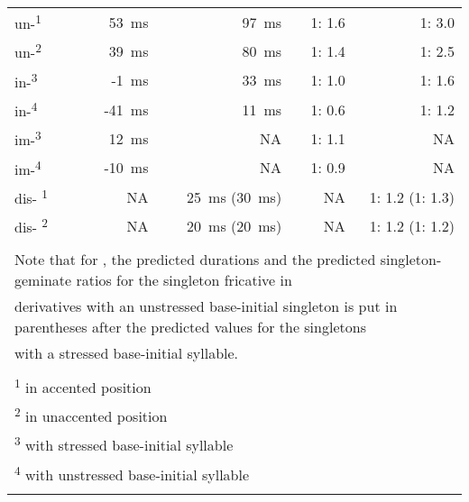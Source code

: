 \begin{table}
{\begin{tabular} {lrrrr}
				\midrule			
				{un-}\textsuperscript{1}& 53~ms & 97~ms   &  1: 1.6&1: 3.0\\ 
				{un-}\textsuperscript{2}& 39~ms & 80~ms   & 1: 1.4&1: 2.5\\ 
				
				{in-}\textsuperscript{3}&-1~ms &33~ms&1: 1.0&1: 1.6\\ 
				{in-}\textsuperscript{4}&-41~ms &11~ms&  1: 0.6& 1: 1.2\\ 
				
				{im-}\textsuperscript{3}&12~ms &NA  &  1: 1.1&NA \\ 
				{im-}\textsuperscript{4}&-10~ms &NA  & 1: 0.9 & NA\\ 
				
				{dis-} \textsuperscript{1}&NA & 25~ms  (30~ms)&NA &1: 1.2 (1: 1.3)   \\
				{dis-} \textsuperscript{2}&NA & 20~ms  (20~ms)& NA& 1: 1.2 (1: 1.2) \\
				
				
				\midrule
				\\
				\multicolumn{5}{l}{ \footnotesize{Note that for \prefix{dis}, the predicted durations and the predicted singleton-{geminate} ratios for the singleton fricative in}}\\
				\multicolumn{5}{l}{ \footnotesize{derivatives with an unstressed base-initial singleton is put in parentheses after the predicted values for the singletons}}\\
				\multicolumn{5}{l}{ \footnotesize{with a {stressed} base-initial syllable.}}\\
				\\				
				\multicolumn{5}{l}{\textsuperscript{1} \footnotesize{in {accented} position}}\\
				\multicolumn{5}{l}{\textsuperscript{2} \footnotesize{in unaccented position}}\\
				\multicolumn{5}{l}{\textsuperscript{3} \footnotesize{with {stressed} base-initial syllable}}\\
				\multicolumn{5}{l}{\textsuperscript{4} \footnotesize{with unstressed base-initial syllable}}\\

			\lspbottomrule 
			\end{tabular}
		}
	
	
	
	
\end{table}




